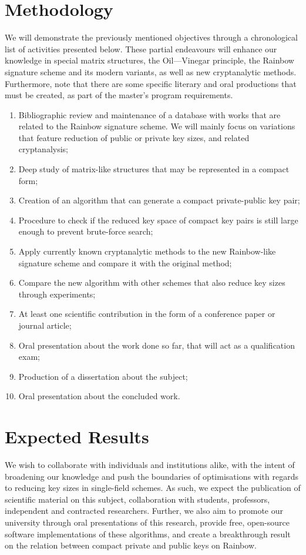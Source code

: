 \documentclass[10pt]{article}
\begin{document}
\section{Methodology}

We will demonstrate the previously mentioned objectives through a chronological
list of activities presented below. These partial endeavours will enhance our
knowledge in special matrix structures, the Oil---Vinegar principle, the
Rainbow signature scheme and its modern variants, as well as new cryptanalytic
methods. Furthermore, note that there are some specific literary and oral
productions that must be created, as part of the master's program requirements.

\begin{enumerate}[label=\alph*.]
  \item Bibliographic review and maintenance of a database with works that
      are related to the Rainbow signature scheme. We will mainly focus on
      variations that feature reduction of public or private key sizes, and
      related cryptanalysis;
  \item Deep study of matrix-like structures that may be represented in a
      compact form;
  \item Creation of an algorithm that can generate a compact private-public key
      pair;
  \item Procedure to check if the reduced key space of compact key pairs is
      still large enough to prevent brute-force search;
  \item Apply currently known cryptanalytic methods to the new Rainbow-like
      signature scheme and compare it with the original method;
  \item Compare the new algorithm with other schemes that also reduce key sizes
      through experiments;
  \item At least one scientific contribution in the form of a conference paper
      or journal article;
  \item Oral presentation about the work done so far, that will act as a
      qualification exam;
  \item Production of a dissertation about the subject;
  \item Oral presentation about the concluded work.
\end{enumerate}

\section{Expected Results}

We wish to collaborate with individuals and institutions alike, with the intent
of broadening our knowledge and push the boundaries of optimisations with
regards to reducing key sizes in single-field schemes. As such, we expect the
publication of scientific material on this subject, collaboration with
students, professors, independent and contracted researchers. Further, we also
aim to promote our university through oral presentations of this research,
provide free, open-source software implementations of these algorithms, and
create a breakthrough result on the relation between compact private and public
keys on Rainbow.



\end{document}
